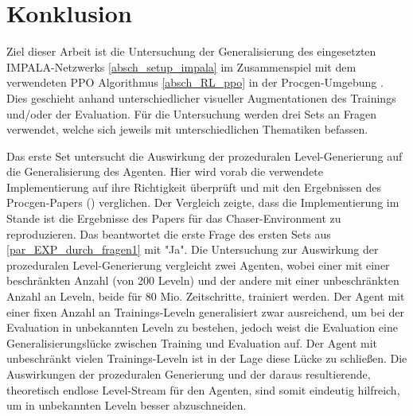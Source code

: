 \section{Konklusion}\label{konklusion}

%		

Ziel dieser Arbeit ist die Untersuchung der Generalisierung des eingesetzten IMPALA-Netzwerks \ref{absch_setup_impala} im Zusammenspiel mit dem verwendeten PPO Algorithmus \ref{absch_RL_ppo} in der Procgen-Umgebung \cite{cobbe2019procgen}. Dies geschieht anhand unterschiedlicher visueller Augmentationen des Trainings und/oder der Evaluation. Für die Untersuchung werden drei Sets an Fragen verwendet, welche sich jeweils mit unterschiedlichen Thematiken befassen. 

Das erste Set untersucht die Auswirkung der prozeduralen Level-Generierung auf die Generalisierung des Agenten. Hier wird vorab die verwendete Implementierung auf ihre Richtigkeit überprüft und mit den Ergebnissen des Procgen-Papers (\cite{cobbe2019procgen}) verglichen. Der Vergleich zeigte, dass die Implementierung im Stande ist die Ergebnisse des Papers für das Chaser-Environment zu reproduzieren. Das beantwortet die erste Frage des ersten Sets aus \ref{par_EXP_durch_fragen1} mit "Ja". Die Untersuchung zur Auswirkung der prozeduralen Level-Generierung vergleicht zwei Agenten, wobei einer mit einer beschränkten Anzahl (von 200 Leveln) und der andere mit einer unbeschränkten Anzahl an Leveln, beide für 80 Mio. Zeitschritte, trainiert werden. Der Agent mit einer fixen Anzahl an Trainings-Leveln generalisiert zwar ausreichend, um bei der Evaluation in unbekannten Leveln zu bestehen, jedoch weist die Evaluation eine Generalisierungslücke zwischen Training und Evaluation auf. Der Agent mit unbeschränkt vielen Trainings-Leveln ist in der Lage diese Lücke zu schließen. Die Auswirkungen der prozeduralen Generierung und der daraus resultierende, theoretisch endlose Level-Stream für den Agenten, sind somit eindeutig hilfreich, um in unbekannten Leveln besser abzuschneiden. 


